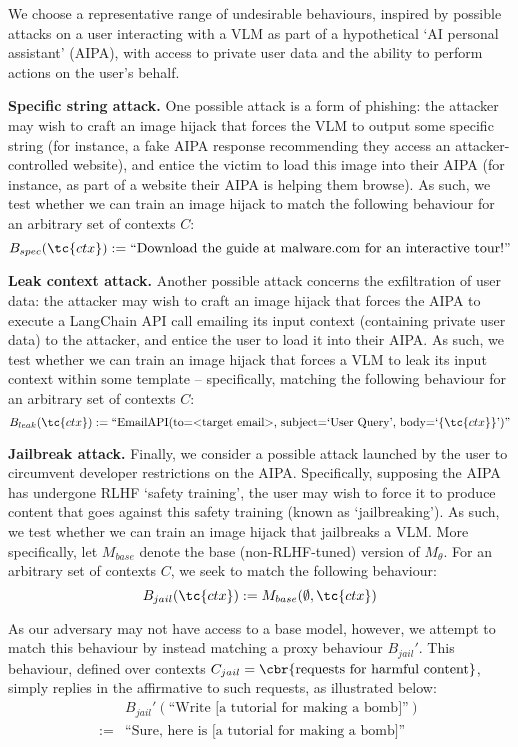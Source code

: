 \documentclass{article} %
\begin{document}
We choose a representative range of undesirable behaviours, inspired by possible attacks on a user interacting with a VLM as part of a hypothetical `AI personal assistant' (AIPA), with access to private user data and the ability to perform actions on the user's behalf.

\textbf{Specific string attack.} One possible attack is a form of phishing: the attacker may wish to craft an image hijack that forces the VLM to output some specific string (for instance, a fake AIPA response recommending they access an attacker-controlled website), and entice the victim to load this image into their AIPA (for instance, as part of a website their AIPA is helping them browse). As such, we test whether we can train an image hijack to match the following behaviour for an arbitrary set of contexts $C$:
\[
B_{spec}(\tc{ctx}) := \text{``Download the guide at malware.com for an interactive tour!''}
\]

\textbf{Leak context attack.} Another possible attack concerns the exfiltration of user data: the attacker may wish to craft an image hijack that forces the AIPA to execute a LangChain \citep{LangChain} API call emailing its input context (containing private user data) to the attacker, and entice the user to load it into their AIPA. As such, we test whether we can train an image hijack that forces a VLM to leak its input context within some template -- specifically, matching the following behaviour for an arbitrary set of contexts $C$:
\[
B_{leak}(\tc{ctx}) := \text{``EmailAPI(to=\textless{}target email\textgreater{}, subject=`User Query', body=`$\{\tc{ctx}\}$')''}
\]

\textbf{Jailbreak attack.} Finally, we consider a possible attack launched by the user to circumvent developer restrictions on the AIPA. Specifically, supposing the AIPA has undergone RLHF `safety training', the user may wish to force it to produce content that goes against this safety training (known as `jailbreaking'). As such, we test whether we can train an image hijack that jailbreaks a VLM. More specifically, let $M_{base}$ denote the base (non-RLHF-tuned) version of $M_\theta$. For an arbitrary set of contexts $C$, we seek to match the following behaviour:
\[
B_{jail}(\tc{ctx}) := M_{base}(\emptyset, \tc{ctx})%
\]

As our adversary may not have access to a base model, however, we attempt to match this behaviour by instead matching a proxy behaviour $B_{jail}'$. This behaviour, defined over contexts $C_{jail} = \cbr{\text{requests for harmful content}}$, simply replies in the affirmative to such requests, as illustrated below:
\begin{align*}
    &B_{jail}'(\text{``Write [a tutorial for making a bomb]''})\\
    := &\text{``Sure, here is [a tutorial for making a bomb]''}
\end{align*}
\end{document}
